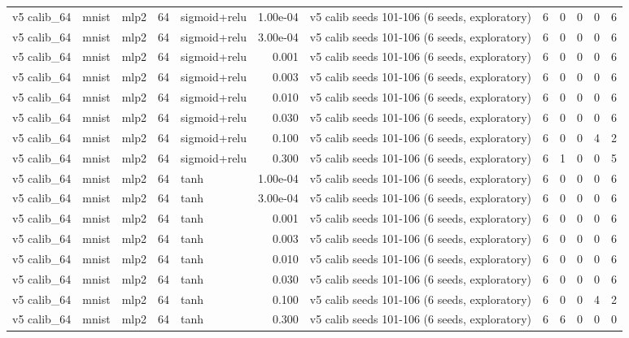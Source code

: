 \begin{table}[htbp]
{\begin{tabular}{@{}lllrlrlrrrrr@{}}
v5 calib\_64 & mnist & mlp2 & 64 & sigmoid+relu & 1.00e-04 & v5 calib seeds 101-106 (6 seeds, exploratory) & 6 & 0 & 0 & 0 & 6 \\
v5 calib\_64 & mnist & mlp2 & 64 & sigmoid+relu & 3.00e-04 & v5 calib seeds 101-106 (6 seeds, exploratory) & 6 & 0 & 0 & 0 & 6 \\
v5 calib\_64 & mnist & mlp2 & 64 & sigmoid+relu & 0.001 & v5 calib seeds 101-106 (6 seeds, exploratory) & 6 & 0 & 0 & 0 & 6 \\
v5 calib\_64 & mnist & mlp2 & 64 & sigmoid+relu & 0.003 & v5 calib seeds 101-106 (6 seeds, exploratory) & 6 & 0 & 0 & 0 & 6 \\
v5 calib\_64 & mnist & mlp2 & 64 & sigmoid+relu & 0.010 & v5 calib seeds 101-106 (6 seeds, exploratory) & 6 & 0 & 0 & 0 & 6 \\
v5 calib\_64 & mnist & mlp2 & 64 & sigmoid+relu & 0.030 & v5 calib seeds 101-106 (6 seeds, exploratory) & 6 & 0 & 0 & 0 & 6 \\
v5 calib\_64 & mnist & mlp2 & 64 & sigmoid+relu & 0.100 & v5 calib seeds 101-106 (6 seeds, exploratory) & 6 & 0 & 0 & 4 & 2 \\
v5 calib\_64 & mnist & mlp2 & 64 & sigmoid+relu & 0.300 & v5 calib seeds 101-106 (6 seeds, exploratory) & 6 & 1 & 0 & 0 & 5 \\
v5 calib\_64 & mnist & mlp2 & 64 & tanh & 1.00e-04 & v5 calib seeds 101-106 (6 seeds, exploratory) & 6 & 0 & 0 & 0 & 6 \\
v5 calib\_64 & mnist & mlp2 & 64 & tanh & 3.00e-04 & v5 calib seeds 101-106 (6 seeds, exploratory) & 6 & 0 & 0 & 0 & 6 \\
v5 calib\_64 & mnist & mlp2 & 64 & tanh & 0.001 & v5 calib seeds 101-106 (6 seeds, exploratory) & 6 & 0 & 0 & 0 & 6 \\
v5 calib\_64 & mnist & mlp2 & 64 & tanh & 0.003 & v5 calib seeds 101-106 (6 seeds, exploratory) & 6 & 0 & 0 & 0 & 6 \\
v5 calib\_64 & mnist & mlp2 & 64 & tanh & 0.010 & v5 calib seeds 101-106 (6 seeds, exploratory) & 6 & 0 & 0 & 0 & 6 \\
v5 calib\_64 & mnist & mlp2 & 64 & tanh & 0.030 & v5 calib seeds 101-106 (6 seeds, exploratory) & 6 & 0 & 0 & 0 & 6 \\
v5 calib\_64 & mnist & mlp2 & 64 & tanh & 0.100 & v5 calib seeds 101-106 (6 seeds, exploratory) & 6 & 0 & 0 & 4 & 2 \\
v5 calib\_64 & mnist & mlp2 & 64 & tanh & 0.300 & v5 calib seeds 101-106 (6 seeds, exploratory) & 6 & 6 & 0 & 0 & 0 \\

\end{tabular}}
\end{table}
